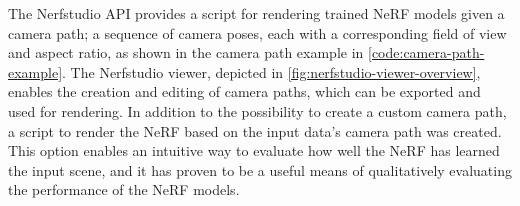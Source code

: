 The Nerfstudio API provides a script for rendering trained NeRF models given a camera path; a sequence of camera poses, each with a corresponding field of view and aspect ratio, as shown in the camera path example in \autoref{code:camera-path-example}. The Nerfstudio viewer, depicted in \autoref{fig:nerfstudio-viewer-overview}, enables the creation and editing of camera paths, which can be exported and used for rendering. In addition to the possibility to create a custom camera path, a script to render the NeRF based on the input data's camera path was created. This option enables an intuitive way to evaluate how well the NeRF has learned the input scene, and it has proven to be a useful means of qualitatively evaluating the performance of the NeRF models.






\begin{comment}
\begin{equation} \label{eq:distortion_loss}
\mathcal{L}_{\text{distortion}} = \frac{1}{N} \sum_{i=1}^{N} \left(\sum_{j=1}^{M_i} w_{ij} \sum_{k=1}^{M_i} w_{ik} \left| \frac{t_{ij} + t_{ik}}{2} - \frac{t_{i,j-1} + t_{i,k-1}}{2} \right| \right) + \frac{1}{3N} \sum_{i=1}^{N} \sum_{j=1}^{M_i} w_{ij}^2 (t_{ij} - t_{i,j-1})
\end{equation}

\begin{center}
    \small{where $N$ is the number of ray samples, $M_i$ is the number of samples for the $i$-th ray, $w_{ij}$ is the weight for the $j$-th sample of the $i$-th ray, $t_{ij}$ is the $j$-th sample of the $i$-th ray in the $s$-domain, and $t_{i,j-1}$ is the $(j-1)$-th sample of the $i$-th ray in the $s$-domain.}
\end{center}


\begin{equation} \label{eq:interlevel_loss}
\mathcal{L}_{\text{interlevel}} = \frac{1}{N} \sum_{i=1}^{N-1} \frac{1}{M_i} \sum_{j=1}^{M_i} \left(\max(0, w_j - w_{\text{outer},ij})\right)^2 \cdot \frac{1}{w_j + \epsilon}
\end{equation}

\begin{center}
    \small{where $N$ is the number of ray samples, $M_i$ is the number of samples for the $i$-th ray, $w_j$ is the weight for the $j$-th sample of the $i$-th ray, $w_{\text{outer},ij}$ is the upper bound of the inner histogram for the $j$-th sample of the $i$-th ray, and $\epsilon$ is a small constant.}
\end{center}
\end{comment}




